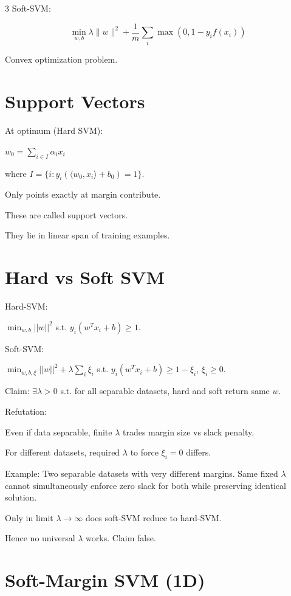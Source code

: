 \documentclass[8pt,fleqn]{extarticle}
\begin{document}
\begin{multicols}{3}
Soft-SVM:

\[
\min_{w,b}
\lambda\|w\|^2
+
\frac1m\sum_i
\max(0,1-y_i f(x_i))
\]

Convex optimization problem.

\section*{Support Vectors}

At optimum (Hard SVM):

$w_0 = \sum_{i\in I} \alpha_i x_i$

where $I=\{i: y_i(\langle w_0,x_i\rangle+b_0)=1\}$.

Only points exactly at margin contribute.

These are called support vectors.

They lie in linear span of training examples.

\section*{Hard vs Soft SVM}

Hard-SVM:

$\min_{w,b} ||w||^2$
s.t. $y_i(w^Tx_i+b)\ge1$.

Soft-SVM:

$\min_{w,b,\xi}
||w||^2+\lambda\sum_i\xi_i$
s.t. $y_i(w^Tx_i+b)\ge1-\xi_i$,
$\xi_i\ge0$.

Claim:
$\exists\lambda>0$ s.t. for all separable datasets,
hard and soft return same $w$.

Refutation:

Even if data separable,
finite $\lambda$ trades margin size vs slack penalty.

For different datasets,
required $\lambda$ to force $\xi_i=0$ differs.

Example:
Two separable datasets with very different margins.
Same fixed $\lambda$ cannot simultaneously enforce zero slack
for both while preserving identical solution.

Only in limit $\lambda\to\infty$
does soft-SVM reduce to hard-SVM.

Hence no universal $\lambda$ works.
Claim false.

\section*{Soft-Margin SVM (1D)}


\end{multicols}
\end{document}
